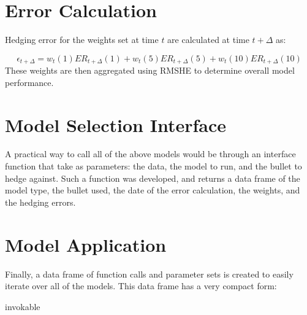\documentclass[openany]{book}
\newenvironment{Shaded}{\begin{snugshade}}{\end{snugshade}}
\newcommand{\NormalTok}[1]{#1}
\theoremstyle{definition}
\theoremstyle{definition}
\theoremstyle{definition}
\theoremstyle{remark}
\begin{document}
\normalsize

\hypertarget{error-calculation}{%
\section{Error Calculation}\label{error-calculation}}

Hedging error for the weights set at time \(t\) are calculated at time
\(t+\Delta\) as:

\[ \epsilon_{t+\Delta} = w_t(1) ER_{t+\Delta}(1) + w_t(5) ER_{t+\Delta}(5) + w_t(10) ER_{t+\Delta}(10) \]
These weights are then aggregated using RMSHE to determine overall model
performance.

\small

\normalsize

\hypertarget{model-selection-interface}{%
\section{Model Selection Interface}\label{model-selection-interface}}

A practical way to call all of the above models would be through an
interface function that take as parameters: the data, the model to run,
and the bullet to hedge against. Such a function was developed, and
returns a data frame of the model type, the bullet used, the date of the
error calculation, the weights, and the hedging errors.

\small

\normalsize

\small

\normalsize

\small

\normalsize

\small

\normalsize

\hypertarget{model-application}{%
\section{Model Application}\label{model-application}}

\small

\normalsize

Finally, a data frame of function calls and parameter sets is created to
easily iterate over all of the models. This data frame has a very
compact form:

\small

\begin{Shaded}
\begin{Highlighting}[]
\NormalTok{invokable}
\end{Highlighting}
\end{Shaded}
\end{document}
